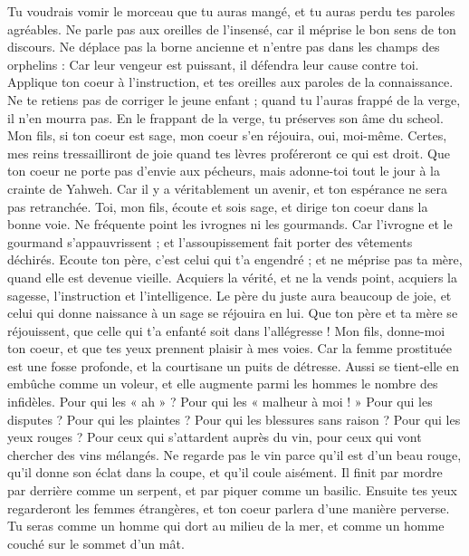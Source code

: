 \begin{multicols}{2}
Tu voudrais vomir le morceau que tu auras mangé, et tu auras perdu tes paroles agréables.
Ne parle pas aux oreilles de l'insensé, car il méprise le bon sens de ton discours.
Ne déplace pas la borne ancienne et n'entre pas dans les champs des orphelins :
Car leur vengeur est puissant, il défendra leur cause contre toi.
Applique ton coeur à l'instruction, et tes oreilles aux paroles de la connaissance.
Ne te retiens pas de corriger le jeune enfant ; quand tu l'auras frappé de la verge, il n'en mourra pas.
En le frappant de la verge, tu préserves son âme du scheol.
Mon fils, si ton coeur est sage, mon coeur s'en réjouira, oui, moi-même.
Certes, mes reins tressailliront de joie quand tes lèvres proféreront ce qui est droit.
Que ton coeur ne porte pas d'envie aux pécheurs, mais adonne-toi tout le jour à la crainte de Yahweh.
Car il y a véritablement un avenir, et ton espérance ne sera pas retranchée.
Toi, mon fils, écoute et sois sage, et dirige ton coeur dans la bonne voie.
Ne fréquente point les ivrognes ni les gourmands.
Car l'ivrogne et le gourmand s'appauvrissent ; et l'assoupissement fait porter des vêtements déchirés.
Ecoute ton père, c'est celui qui t'a engendré ; et ne méprise pas ta mère, quand elle est devenue vieille.
Acquiers la vérité, et ne la vends point, acquiers la sagesse, l'instruction et l'intelligence.
Le père du juste aura beaucoup de joie, et celui qui donne naissance à un sage se réjouira en lui.
Que ton père et ta mère se réjouissent, que celle qui t'a enfanté soit dans l'allégresse !
Mon fils, donne-moi ton coeur, et que tes yeux prennent plaisir à mes voies.
Car la femme prostituée est une fosse profonde, et la courtisane un puits de détresse.
Aussi se tient-elle en embûche comme un voleur, et elle augmente parmi les hommes le nombre des infidèles.
Pour qui les « ah » ? Pour qui les « malheur à moi ! » Pour qui les disputes ? Pour qui les plaintes ? Pour qui les blessures sans raison ? Pour qui les yeux rouges ?
Pour ceux qui s'attardent auprès du vin, pour ceux qui vont chercher des vins mélangés.
Ne regarde pas le vin parce qu'il est d'un beau rouge, qu'il donne son éclat dans la coupe, et qu'il coule aisément.
Il finit par mordre par derrière comme un serpent, et par piquer comme un basilic.
Ensuite tes yeux regarderont les femmes étrangères, et ton coeur parlera d'une manière perverse.
Tu seras comme un homme qui dort au milieu de la mer, et comme un homme couché sur le sommet d'un mât.

\end{multicols}
